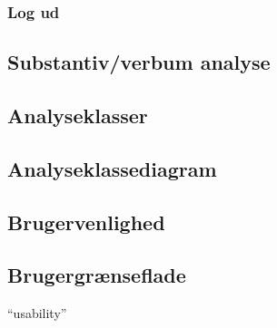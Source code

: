 \subsubsection{Log ud}

\subsection{Substantiv/verbum analyse }

\subsection{Analyseklasser}

\subsection{Analyseklassediagram}

\subsection{Brugervenlighed}

\subsection{Brugergrænseflade}

“usability”
